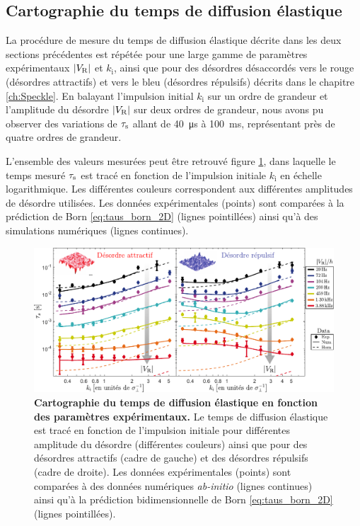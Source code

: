 \subsection{Cartographie du temps de diffusion élastique}

La procédure de mesure du temps de diffusion élastique décrite dans les deux sections précédentes est répétée pour une large gamme de paramètres expérimentaux $|V_{\mathrm{R}}|$ et $k_{\mathrm{i}}$, ainsi que pour des désordres désaccordés vers le rouge (désordres attractifs) et vers le bleu (désordres répulsifs) décrits dans le chapitre \ref{ch:Speckle}. En balayant l'impulsion initial $k_{\mathrm{i}}$ sur un ordre de grandeur et l'amplitude du désordre $|V_{\mathrm{R}}|$ sur deux ordres de grandeur, nous avons pu observer des variations de $\tau_{\mathrm{s}}$ allant de \SI{40}{\micro\second} à \SI{100}{\milli\second}, représentant près de quatre ordres de grandeur. 

L'ensemble des valeurs mesurées peut être retrouvé figure \ref{fig:donnees_taus_prl}, dans laquelle le temps mesuré $\tau_{\mathrm{s}}$ est tracé en fonction de l'impulsion initiale $k_{\mathrm{i}}$ en échelle logarithmique. Les différentes couleurs correspondent aux différentes amplitudes de désordre utilisées. Les données expérimentales (points) sont comparées à la prédiction de Born \ref{eq:taus_born_2D} (lignes pointillées) ainsi qu'à des simulations numériques (lignes continues). 

\begin{figure}
\centering
\includegraphics[width=\textwidth]{Fig/TauS_PRL/donnees_taus_prl.pdf}
\caption{\textbf{Cartographie du temps de diffusion élastique en fonction des paramètres expérimentaux.} Le temps de diffusion élastique est tracé en fonction de l'impulsion initiale pour différentes amplitude du désordre (différentes couleurs) ainsi que pour des désordres attractifs (cadre de gauche) et des désordres répulsifs (cadre de droite). Les données expérimentales (points) sont comparées à des données numériques \textit{ab-initio} (lignes continues) ainsi qu'à la prédiction bidimensionnelle de Born \ref{eq:taus_born_2D} (lignes pointillées).}
\label{fig:donnees_taus_prl}
\end{figure}

